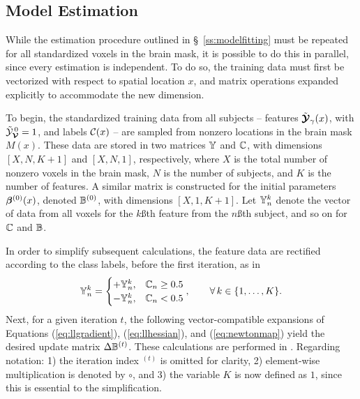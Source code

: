 \subsection{Model Estimation}\label{s:parallelfit}
While the estimation procedure outlined in \S\ \ref{ss:modelfitting} must be repeated for all standardized voxels in the brain mask, it is possible to do this in parallel, since every estimation is independent. To do so, the training data must first be vectorized with respect to spatial location $x$, and matrix operations expanded explicitly to accommodate the new dimension.
\par
To begin, the standardized training data from all subjects -- features $\tilde{\bm{\mathcal{Y}}}_{\gamma}(x)$, with $\tilde{\mathcal{Y}}_{\bm{\mathcal{V}}}^{\thinspace0}=1$, and labels $\mathcal{C}(x)$ -- are sampled from nonzero locations in the brain mask $M(x)$. These data are stored in two matrices $\mathbb{Y}$ and $\mathbb{C}$, with dimensions $[X,N,K+1]$ and $[X,N,1]$, respectively, where $X$ is the total number of nonzero voxels in the brain mask, $N$ is the number of subjects, and $K$ is the number of features. A similar matrix is constructed for the initial parameters $\bm{\beta}^{(0)}(x)$, denoted $\mathbb{B}^{(0)}$, with dimensions $[X,1,K+1]$. Let $\mathbb{Y}_n^k$ denote the vector of data from all voxels for the $k$\ss{th} feature from the $n$\ss{th} subject, and so on for $\mathbb{C}$ and $\mathbb{B}$.
\par
In order to simplify subsequent calculations, the feature data are rectified according to the class labels, before the first iteration, as in
\begin{equation}
\mathbb{Y}_n^k =
\begin{cases}
+\mathbb{Y}_n^k, & \mathbb{C}_n \ge 0.5\\
-\mathbb{Y}_n^k, & \mathbb{C}_n <  0.5\\
\end{cases},\qquad\forall\thinspace k \in \{1,\dots,K\}.
\end{equation}
Next, for a given iteration $t$, the following vector-compatible expansions of Equations (\ref{eq:llgradient}), (\ref{eq:llhessian}), and (\ref{eq:newtonmap}) yield the desired update matrix $\Delta\mathbb{B}^{(t)}$. These calculations are performed in .
Regarding notation:
1) the iteration index ${}^{(t)}$ is omitted for clarity,
2) element-wise multiplication is denoted by $\circ$, and
3) the variable $K$ is now defined as $1$, since this is essential to the simplification.
